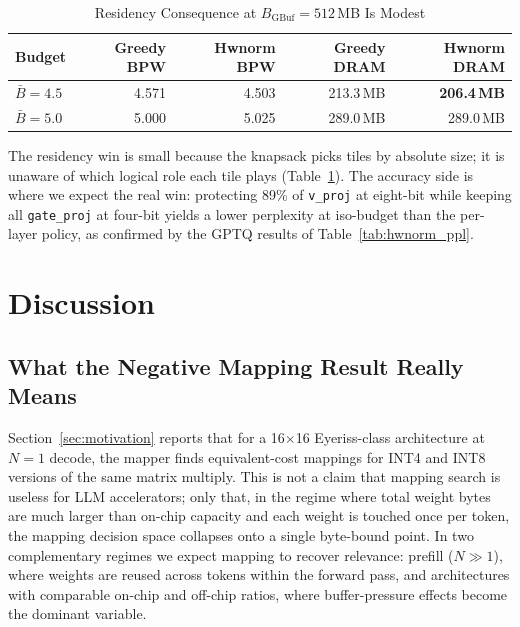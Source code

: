 \documentclass{ieeeaccess}
\begin{document}
\begin{table}[t]
\caption{Residency Consequence at $B_{\mathrm{GBuf}}\!=\!512$\,MB Is Modest}
\label{tab:hwnorm_resid}
\centering
\begin{tabular}{lrrrr}
\toprule
Budget & Greedy BPW & Hwnorm BPW & Greedy DRAM & Hwnorm DRAM \\
\midrule
$\bar B = 4.5$ & 4.571 & 4.503 & 213.3\,MB & \textbf{206.4\,MB} \\
$\bar B = 5.0$ & 5.000 & 5.025 & 289.0\,MB & 289.0\,MB \\
\bottomrule
\end{tabular}
\end{table}

The residency win is small because the knapsack picks tiles by absolute
size; it is unaware of which logical role each tile plays
(Table~\ref{tab:hwnorm_resid}). The accuracy side is where we expect
the real win: protecting 89\% of \texttt{v\_proj} at eight-bit while
keeping all \texttt{gate\_proj} at four-bit yields a lower perplexity
at iso-budget than the per-layer policy, as confirmed by the GPTQ
results of Table~\ref{tab:hwnorm_ppl}.

\section{Discussion}
\label{sec:discussion}

\subsection{What the Negative Mapping Result Really Means}
Section~\ref{sec:motivation} reports that for a 16$\times$16
Eyeriss-class architecture at $N\!=\!1$ decode, the mapper finds
equivalent-cost mappings for INT4 and INT8 versions of the same matrix
multiply. This is not a claim that mapping search is useless for LLM
accelerators; only that, in the regime where total weight bytes are
much larger than on-chip capacity and each weight is touched once per
token, the mapping decision space collapses onto a single
byte-bound point. In two complementary regimes we expect mapping to
recover relevance: prefill ($N \gg 1$), where weights are reused across
tokens within the forward pass, and architectures with comparable
on-chip and off-chip ratios, where buffer-pressure effects become the
dominant variable.
\end{document}
